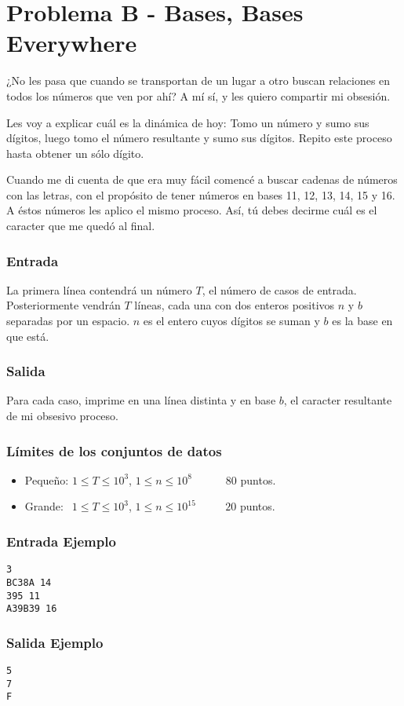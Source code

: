 \chapter*{Problema B - Bases, Bases Everywhere}

¿No les pasa que cuando se transportan de un lugar a otro
buscan relaciones en todos los números que ven por ahí?
A mí sí, y les quiero compartir mi obsesión.

Les voy a explicar cuál es la dinámica de hoy: Tomo un
número y sumo sus dígitos, luego tomo el número resultante
y sumo sus dígitos. Repito este proceso hasta obtener un
sólo dígito. 

Cuando me di cuenta de que era muy fácil comencé a buscar 
cadenas de números con las letras, con el propósito de 
tener números en bases 11, 12, 13, 14, 15 y 16. A éstos
números les aplico el mismo proceso. Así, tú debes decirme
cuál es el caracter que me quedó al final.



\subsection*{Entrada}
La primera línea contendrá un número $T$, el número de 
casos de entrada. Posteriormente vendrán $T$ líneas, cada 
una con dos enteros positivos $n$ y $b$ separadas por un 
espacio. $n$ es el entero cuyos dígitos se suman y $b$ es
la base en que está.



\subsection*{Salida}
Para cada caso, imprime en una línea distinta y en base 
$b$, el caracter resultante de mi obsesivo proceso.



\subsection*{Límites de los conjuntos de datos}

\begin{itemize}
    \item Pequeño: $ 1 \leq T \leq 10^3 $, $ 1 \leq n
    \leq 10^8$   $\quad \;\;\;\;\;$ $80$ puntos.
    \item Grande: $ \;\, 1 \leq T \leq 10^{3}$, $ 1 
    \leq n \leq 10^{15} $ $\quad \quad$ $20$ puntos.
\end{itemize}



\begin{multicols}{2}

\subsection*{Entrada Ejemplo}

\begin{verbatim}
3
BC38A 14
395 11
A39B39 16
\end{verbatim}

\columnbreak

\subsection*{Salida Ejemplo}

\begin{verbatim}
5
7
F
\end{verbatim}

\end{multicols}